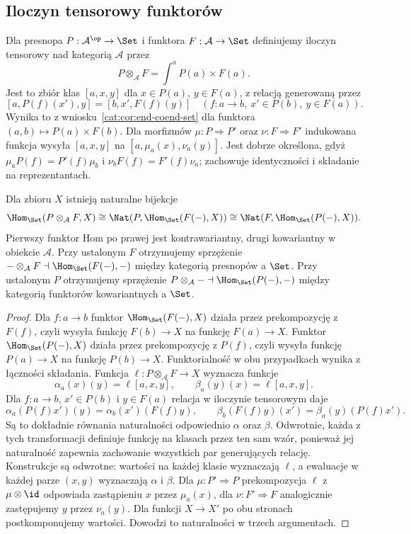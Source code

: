 \subsection{Iloczyn tensorowy funktorów}
\begin{definicja}\label{cat:def:functor-tensor}
Dla presnopa $P:\mathcal A^{\op}\to\Set$ i funktora $F:\mathcal A\to\Set$ definiujemy iloczyn tensorowy nad kategorią $\mathcal A$ przez
\[
 P\otimes_{\mathcal A}F=\int^a P(a)\times F(a).
\]
Jest to zbiór klas $[a,x,y]$ dla $x\in P(a)$, $y\in F(a)$, z relacją generowaną przez
\[
 [a,P(f)(x'),y]=[b,x',F(f)(y)]
 \quad(f:a\to b,\ x'\in P(b),\ y\in F(a)).
\]
Wynika to z wniosku~\ref{cat:cor:end-coend-set} dla funktora $(a,b)\mapsto P(a)\times F(b)$. Dla morfizmów $\mu:P\Rightarrow P'$ oraz $\nu:F\Rightarrow F'$ indukowana funkcja wysyła $[a,x,y]$ na $[a,\mu_a(x),\nu_a(y)]$. Jest dobrze określona, gdyż $\mu_aP(f)=P'(f)\mu_b$ i $\nu_bF(f)=F'(f)\nu_a$; zachowuje identyczności i składanie na reprezentantach.
\end{definicja}
\begin{twierdzenie}\label{cat:thm:functor-tensor-hom}
Dla zbioru $X$ istnieją naturalne bijekcje
\[
 \Hom_{\Set}(P\otimes_{\mathcal A}F,X)
 \cong\Nat(P,\Hom_{\Set}(F(-),X))
 \cong\Nat(F,\Hom_{\Set}(P(-),X)).
\]
Pierwszy funktor Hom po prawej jest kontrawariantny, drugi kowariantny w obiekcie $\mathcal A$. Przy ustalonym $F$ otrzymujemy sprzężenie $-\otimes_{\mathcal A}F\dashv\Hom_{\Set}(F(-),-)$ między kategorią presnopów a $\Set$. Przy ustalonym $P$ otrzymujemy sprzężenie $P\otimes_{\mathcal A}-\dashv\Hom_{\Set}(P(-),-)$ między kategorią funktorów kowariantnych a $\Set$.
\end{twierdzenie}
\begin{proof}
Dla $f:a\to b$ funktor $\Hom_{\Set}(F(-),X)$ działa przez prekompozycję z $F(f)$, czyli wysyła funkcję $F(b)\to X$ na funkcję $F(a)\to X$. Funktor $\Hom_{\Set}(P(-),X)$ działa przez prekompozycję z $P(f)$, czyli wysyła funkcję $P(a)\to X$ na funkcję $P(b)\to X$. Funktorialność w obu przypadkach wynika z łączności składania. Funkcja $\ell:P\otimes_{\mathcal A}F\to X$ wyznacza funkcje
\[
 \alpha_a(x)(y)=\ell[a,x,y],\qquad
 \beta_a(y)(x)=\ell[a,x,y].
\]
Dla $f:a\to b$, $x'\in P(b)$ i $y\in F(a)$ relacja w iloczynie tensorowym daje
\[
 \alpha_a(P(f)x')(y)=\alpha_b(x')(F(f)y),
 \qquad
 \beta_b(F(f)y)(x')=\beta_a(y)(P(f)x').
\]
Są to dokładnie równania naturalności odpowiednio $\alpha$ oraz $\beta$. Odwrotnie, każda z tych transformacji definiuje funkcję na klasach przez ten sam wzór, ponieważ jej naturalność zapewnia zachowanie wszystkich par generujących relację. Konstrukcje są odwrotne: wartości na każdej klasie wyznaczają $\ell$, a ewaluacje w każdej parze $(x,y)$ wyznaczają $\alpha$ i $\beta$. Dla $\mu:P'\Rightarrow P$ prekompozycja $\ell$ z $\mu\otimes\id$ odpowiada zastąpieniu $x$ przez $\mu_a(x)$, dla $\nu:F'\Rightarrow F$ analogicznie zastępujemy $y$ przez $\nu_a(y)$. Dla funkcji $X\to X'$ po obu stronach postkomponujemy wartości. Dowodzi to naturalności w trzech argumentach.
\end{proof}
